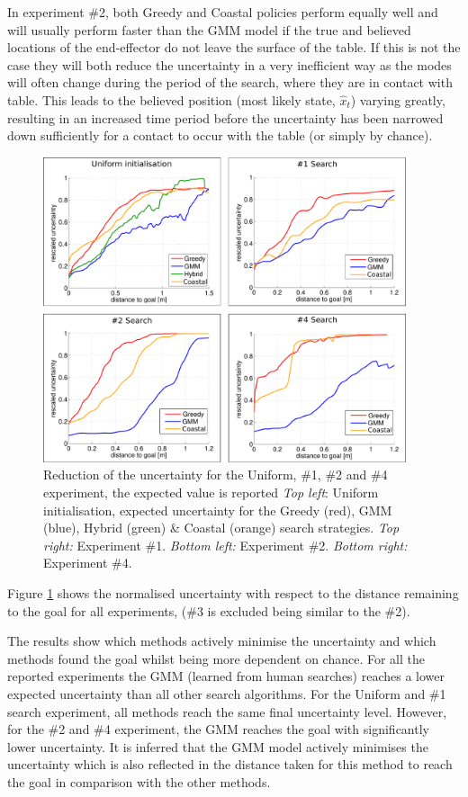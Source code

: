 In experiment \#2, both Greedy and Coastal policies perform equally well and will usually perform faster than the GMM model if the true and believed locations of the 
end-effector do not leave the surface of the table. If this is not the 
case they will both reduce the uncertainty in a very inefficient way as the modes will often change during the period of the search, where they are in contact 
with table. This leads to the believed position (most likely state, $\hat{x}_t$) varying greatly, resulting in an increased time period before the uncertainty 
has been narrowed down sufficiently for a contact to occur with the table (or simply by chance).


\begin{figure}[h]
   \centering
  \includegraphics[width=0.95\textwidth]{./ch3-Search/Figures/Figure12}
\caption{Reduction of the uncertainty for the Uniform, \#1, \#2 and \#4 experiment, the expected value is reported
\textit{Top left}: Uniform initialisation, expected uncertainty for the Greedy (red), GMM (blue), Hybrid (green) \& Coastal (orange) search
 strategies.
\textit{Top right:} Experiment \#1. \textit{Bottom left:} Experiment \#2. \textit{Bottom right:} Experiment \#4.}
\label{fig:uncertainty}
\end{figure}


Figure \ref{fig:uncertainty} shows the normalised uncertainty with respect to the distance remaining to the goal for all experiments, 
(\#3 is excluded being similar to the \#2). 

The results show which methods actively minimise the uncertainty and which methods found the goal whilst being more dependent on chance. For all the reported experiments
the GMM (learned from human searches) reaches a lower expected uncertainty than all other search algorithms. 
For the Uniform and \#1 search experiment, all methods reach the same final uncertainty level. However, for the \#2 and \#4 experiment, the GMM reaches the goal with significantly 
lower uncertainty. It is inferred that the GMM model actively minimises the uncertainty which is also reflected in the distance taken for 
this method to reach the goal in comparison with the other methods.

